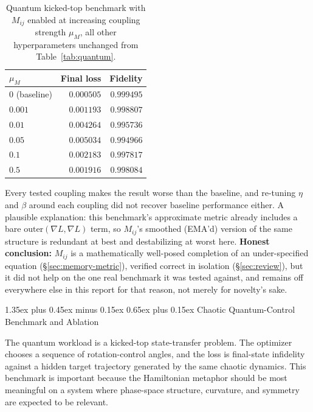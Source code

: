\documentclass[10pt,twocolumn]{article}
\makeatletter
\renewcommand\section{\@startsection{section}{1}{0pt}%
  {1.35ex plus 0.45ex minus 0.15ex}%
  {0.65ex plus 0.15ex}%
  {\large\bfseries}}
\makeatother
\begin{document}
\begin{table}[htbp]
\centering
\caption{Quantum kicked-top benchmark with $M_{ij}$ enabled at increasing
coupling strength $\mu_M$, all other hyperparameters unchanged from
Table~\ref{tab:quantum}.}
\label{tab:memory-metric-test}
\begin{tabular}{@{}lrr@{}}
\toprule
$\mu_M$ & Final loss & Fidelity \\
\midrule
$0$ (baseline) & $\mathbf{0.000505}$ & $\mathbf{0.999495}$ \\
$0.001$ & $0.001193$ & $0.998807$ \\
$0.01$ & $0.004264$ & $0.995736$ \\
$0.05$ & $0.005034$ & $0.994966$ \\
$0.1$ & $0.002183$ & $0.997817$ \\
$0.5$ & $0.001916$ & $0.998084$ \\
\bottomrule
\end{tabular}
\end{table}

Every tested coupling makes the result worse than the baseline, and
re-tuning $\eta$ and $\beta$ around each coupling did not recover baseline
performance either. A plausible explanation: this benchmark's approximate
metric already includes a bare
$\mathrm{outer}(\nabla L,\nabla L)$ term, so $M_{ij}$'s smoothed (EMA'd)
version of the same structure is redundant at best and destabilizing at
worst here. \textbf{Honest conclusion:} $M_{ij}$ is a mathematically
well-posed completion of an under-specified equation
(\S\ref{sec:memory-metric}), verified correct in isolation
(\S\ref{sec:review}), but it did not help on the one real benchmark it was
tested against, and remains off everywhere
else in this report for that reason, not merely for novelty's sake.

\section{Chaotic Quantum-Control Benchmark and Ablation}
\label{sec:quantum-benchmark}

The quantum workload is a kicked-top state-transfer problem. The optimizer
chooses a sequence of rotation-control angles, and the loss is final-state
infidelity against a hidden target trajectory generated by the same chaotic
dynamics. This benchmark is important because the Hamiltonian metaphor should
be most meaningful on a system where phase-space structure, curvature, and
symmetry are expected to be relevant.
\end{document}
